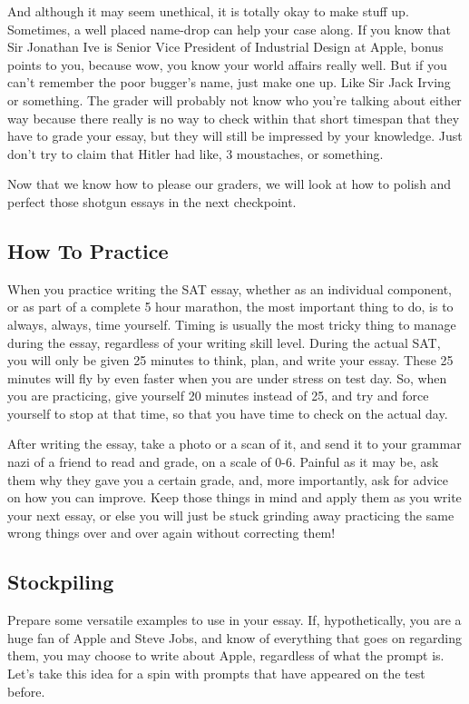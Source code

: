And although it may seem unethical, it is totally okay to make stuff up. Sometimes, a well placed name-drop can help your case along. If you know that Sir Jonathan Ive is Senior Vice President of Industrial Design at Apple, bonus points to you, because wow, you know your world affairs really well. But if you can't remember the poor bugger's name, just make one up. Like Sir Jack Irving or something. The grader will probably not know who you're talking about either way because there really is no way to check within that short timespan that they have to grade your essay, but they will still be impressed by your knowledge. Just don't try to claim that Hitler had like, 3 moustaches, or something.

Now that we know how to please our graders, we will look at how to polish and perfect those shotgun essays in the next checkpoint.
\subsection{How To Practice}
When you practice writing the SAT essay, whether as an individual component, or as part of a complete 5 hour marathon, the most important thing to do, is to always, always, time yourself. Timing is usually the most tricky thing to manage during the essay, regardless of your writing skill level. During the actual SAT, you will only be given 25 minutes to think, plan, and write your essay. These 25 minutes will fly by even faster when you are under stress on test day. So, when you are practicing, give yourself 20 minutes instead of 25, and try and force yourself to stop at that time, so that you have time to check on the actual day.

After writing the essay, take a photo or a scan of it, and send it to your grammar nazi of a friend to read and grade, on a scale of 0-6. Painful as it may be, ask them why they gave you a certain grade, and, more importantly, ask for advice on how you can improve. Keep those things in mind and apply them as you write your next essay, or else you will just be stuck grinding away practicing the same wrong things over and over again without correcting them!
\subsection{Stockpiling}
Prepare some versatile examples to use in your essay. If, hypothetically, you are a huge fan of Apple and Steve Jobs, and know of everything that goes on regarding them, you may choose to write about Apple, regardless of what the prompt is. Let's take this idea for a spin with prompts that have appeared on the test before.

